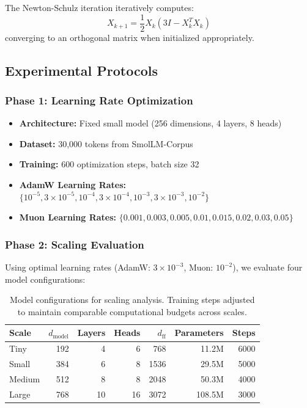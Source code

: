 \documentclass[11pt,a4paper]{article}
\begin{document}
The Newton-Schulz iteration iteratively computes:
\begin{equation}
    X_{k+1} = \frac{1}{2}X_k(3I - X_k^T X_k)
\end{equation}
converging to an orthogonal matrix when initialized appropriately.

\subsection{Experimental Protocols}

\subsubsection{Phase 1: Learning Rate Optimization}
\begin{itemize}[leftmargin=*]
    \item \textbf{Architecture:} Fixed small model (256 dimensions, 4 layers, 8 heads)
    \item \textbf{Dataset:} 30,000 tokens from SmolLM-Corpus
    \item \textbf{Training:} 600 optimization steps, batch size 32
    \item \textbf{AdamW Learning Rates:} $\{10^{-5}, 3 \times 10^{-5}, 10^{-4}, 3 \times 10^{-4}, 10^{-3}, 3 \times 10^{-3}, 10^{-2}\}$
    \item \textbf{Muon Learning Rates:} $\{0.001, 0.003, 0.005, 0.01, 0.015, 0.02, 0.03, 0.05\}$
\end{itemize}

\subsubsection{Phase 2: Scaling Evaluation}
Using optimal learning rates (AdamW: $3 \times 10^{-3}$, Muon: $10^{-2}$), we evaluate four model configurations:

\begin{table}[H]
\centering
\caption{Model configurations for scaling analysis. Training steps adjusted to maintain comparable computational budgets across scales.}
\label{tab:model_configs}
\begin{tabular}{@{}lrrrrrr@{}}
\toprule
\textbf{Scale} & \textbf{$d_{\text{model}}$} & \textbf{Layers} & \textbf{Heads} & \textbf{$d_{\text{ff}}$} & \textbf{Parameters} & \textbf{Steps} \\
\midrule
Tiny   & 192  & 4  & 6  & 768   & 11.2M  & 6000 \\
Small  & 384  & 6  & 8  & 1536  & 29.5M  & 5000 \\
Medium & 512  & 8  & 8  & 2048  & 50.3M  & 4000 \\
Large  & 768  & 10 & 16 & 3072  & 108.5M & 3000 \\
\bottomrule
\end{tabular}
\end{table}
\end{document}
